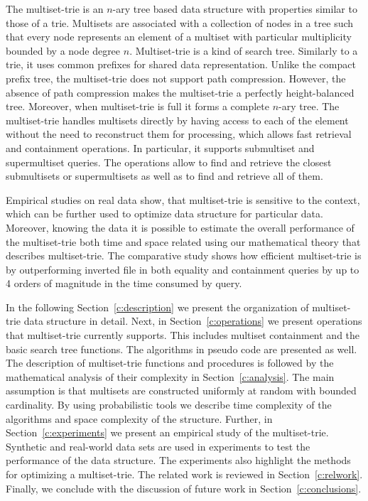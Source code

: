 The multiset-trie is an $n$-ary tree based data structure with properties similar to those of a trie. 
Multisets are associated with a collection of nodes in a tree such that every node represents an element 
of a multiset with particular multiplicity bounded by a node degree $n.$
%
Multiset-trie is a kind of search tree. Similarly to a trie, it uses common prefixes for shared data representation.
Unlike the compact prefix tree, the multiset-trie does not support path compression. However, the absence of path 
compression makes the multiset-trie a perfectly height-balanced tree. Moreover, when multiset-trie is full it forms 
a complete $n$-ary tree.
%
The multiset-trie handles multisets directly by having access to each of the element 
without the need to reconstruct them for processing, which allows fast retrieval and 
containment operations. In particular, it supports submultiset and supermultiset queries.
The operations allow to find and retrieve the closest submultisets or supermultisets 
as well as to find and retrieve all of them.


Empirical studies on real data show, that multiset-trie is sensitive to the context, which can 
be further used to optimize data structure for particular data. Moreover, knowing the data 
it is possible to estimate the overall performance of the multiset-trie both time and space 
related using our mathematical theory that describes multiset-trie.
%
The comparative study shows how efficient multiset-trie is by outperforming inverted file in 
both equality and containment queries by up to 4 orders of magnitude in the time consumed by 
query. 


%
In the following Section~\ref{c:description} we present the organization of 
multiset-trie data structure in detail.
%
Next, in Section~\ref{c:operations} we present operations that multiset-trie currently 
supports. This includes multiset containment and the basic search tree functions. 
The algorithms in pseudo code are presented as well. 
%
The description of multiset-trie functions and procedures is followed by the 
mathematical analysis of their complexity in Section~\ref{c:analysis}. 
The main assumption is that multisets are constructed uniformly at random 
with bounded cardinality. By using probabilistic tools we describe time complexity of 
the algorithms and space complexity of the structure.
%
Further, in Section~\ref{c:experiments} we present an empirical study of the 
multiset-trie. Synthetic and real-world data sets are used in experiments to test the performance 
of the data structure. The experiments also highlight the methods for optimizing a multiset-trie.
%
The related work is reviewed in Section~\ref{c:relwork}. 
%
Finally, we conclude with the discussion of future work in Section~\ref{c:conclusions}.
%
